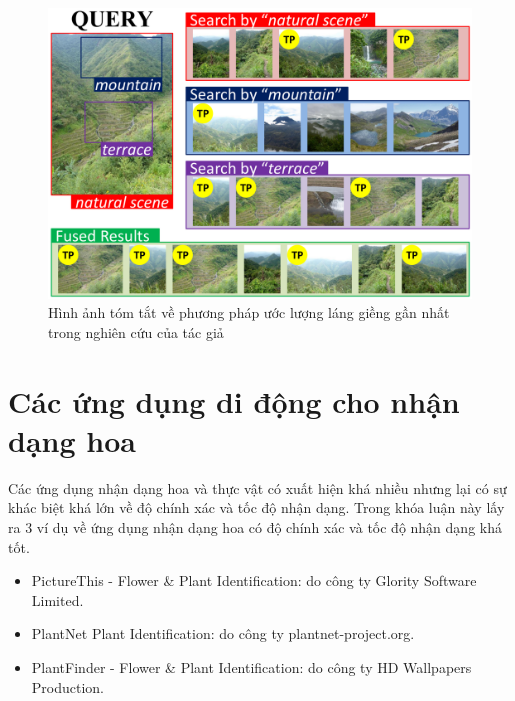 \documentclass[12pt]{report}
\begin{document}
		\begin{figure}[h]
			\centering
			\includegraphics[scale=0.4]{one}
			\caption{Hình ảnh tóm tắt về phương pháp ước lượng láng giềng gần nhất trong nghiên cứu \cite{cia-ONE} của tác giả}
			\label{fig:one}
		\end{figure}		\newpage
																						
		\section{Các ứng dụng di động cho nhận dạng hoa}
																				
		Các ứng dụng nhận dạng hoa và thực vật có xuất hiện khá nhiều nhưng lại có sự khác biệt khá lớn về độ chính xác và tốc độ nhận dạng. Trong khóa luận này lấy ra 3 ví dụ về ứng dụng nhận dạng hoa có độ chính xác và tốc độ nhận dạng khá tốt.
																				
																						
																				
		\begin{itemize}
			\item PictureThis - Flower \& Plant Identification: do công ty Glority Software Limited.	
			\item PlantNet Plant Identification: do công ty plantnet-project.org.
			\item PlantFinder - Flower \& Plant Identification: do công ty HD Wallpapers Production. 		
		\end{itemize}
																				
\end{document}
